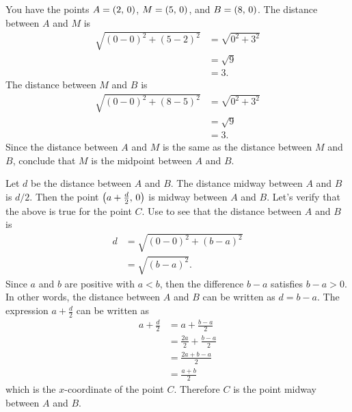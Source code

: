 \documentclass[a4paper,oneside,12pt]{article}
\begin{document}
\begin{problem}
{\begin{solution}
  You have the points $A = \left\lparen{2},\, {0}\right\rparen$, $M = \left\lparen{5},\, {0}\right\rparen$, and
  $B = \left\lparen{8},\, {0}\right\rparen$.  The distance between $A$ and $M$ is
  \begin{align*}
  \sqrt{
    (0 - 0)^2 + (5 - 2)^2
  }
  &=
  \sqrt{0^2 + 3^2} \\[4pt]
  &=
  \sqrt{9} \\[4pt]
  &=
  3.
  \end{align*}
  The distance between $M$ and $B$ is
  \begin{align*}
  \sqrt{
    (0 - 0)^2 + (8 - 5)^2
  }
  &=
  \sqrt{0^2 + 3^2} \\[4pt]
  &=
  \sqrt{9} \\[4pt]
  &=
  3.
  \end{align*}
  Since the distance between $A$ and $M$ is the same as the distance
  between $M$ and $B$, conclude that $M$ is the midpoint between $A$
  and $B$.

  Let $d$ be the distance between $A$ and $B$.  The distance midway
  between $A$ and $B$ is $d/2$.  Then the point
  $\left\lparen{a + \frac{d}{2}},\, {0}\right\rparen$ is midway between $A$ and $B$.  Let's
  verify that the above is true for the point $C$.  Use
   to see that the distance
  between $A$ and $B$ is
  \begin{align*}
  d
  &=
  \sqrt{
    (0 - 0)^2 + (b - a)^2
  } \\[4pt]
  &=
  \sqrt{(b - a)^2}.
  \end{align*}
  Since $a$ and $b$ are positive with $a < b$, then the difference
  $b - a$ satisfies $b - a > 0$.  In other words, the distance
  between $A$ and $B$ can be written as $d = b - a$.  The expression
  $a + \frac{d}{2}$ can be written as
  \begin{align*}
  a + \frac{d}{2}
  &=
  a + \frac{b - a}{2} \\[4pt]
  &=
  \frac{2a}{2}
  +
  \frac{b - a}{2} \\[4pt]
  &=
  \frac{2a + b - a}{2} \\[4pt]
  &=
  \frac{a + b}{2}
  \end{align*}
  which is the $x$-coordinate of the point $C$.  Therefore $C$ is the
  point midway between $A$ and $B$.
  \end{solution}
}{}


\end{problem}
\end{document}
